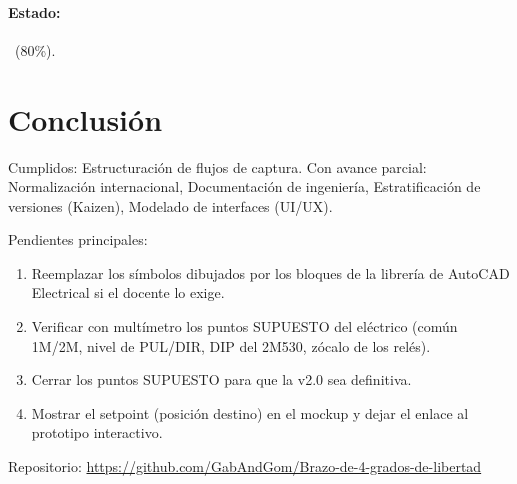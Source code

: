 \documentclass[a4paper,11pt]{article}
\begin{document}
\paragraph{Estado:} \parcial~(80\%).
\section{Conclusión}
Cumplidos: Estructuración de flujos de captura. Con avance parcial: Normalización internacional, Documentación de ingeniería, Estratificación de versiones (Kaizen), Modelado de interfaces (UI/UX).
\par\smallskip Pendientes principales:
\begin{enumerate}
\item Reemplazar los símbolos dibujados por los bloques de la librería de AutoCAD Electrical si el docente lo exige.
\item Verificar con multímetro los puntos SUPUESTO del eléctrico (común 1M/2M, nivel de PUL/DIR, DIP del 2M530, zócalo de los relés).
\item Cerrar los puntos SUPUESTO para que la v2.0 sea definitiva.
\item Mostrar el setpoint (posición destino) en el mockup y dejar el enlace al prototipo interactivo.
\end{enumerate}
\par\smallskip\noindent Repositorio: \url{https://github.com/GabAndGom/Brazo-de-4-grados-de-libertad}
\end{document}
